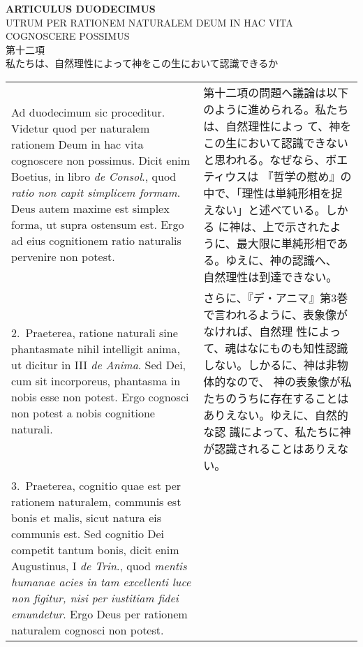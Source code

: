 \documentclass[10pt]{jsarticle} %
\begin{document}
\newpage
{}

\begin{center}
 {\Large {\bf ARTICULUS DUODECIMUS}}\\
{\large UTRUM PER RATIONEM NATURALEM DEUM IN HAC VITA\\COGNOSCERE POSSIMUS}\\
{\large 第十二項\\私たちは、自然理性によって神をこの生において認識できるか}

\end{center}


\begin{longtable}{p{21em}p{21em}}

{\sc  Ad duodecimum sic proceditur}. Videtur quod per naturalem rationem
Deum in hac vita cognoscere non possimus. Dicit enim Boetius, in libro
{\it de Consol}., quod {\it ratio non capit simplicem formam}. Deus
autem maxime est simplex forma, ut supra ostensum est. Ergo ad eius
cognitionem ratio naturalis pervenire non potest.

&

第十二項の問題へ議論は以下のように進められる。私たちは、自然理性によっ
て、神をこの生において認識できないと思われる。なぜなら、ボエティウスは
『哲学の慰め』の中で、「理性は単純形相を捉えない」と述べている。しかる
に神は、上で示されたように、最大限に単純形相である。ゆえに、神の認識へ、
自然理性は到達できない。

\\



2.~{\sc  Praeterea}, ratione naturali sine phantasmate nihil
intelligit anima, ut dicitur in III {\it de Anima}. Sed Dei, cum sit
incorporeus, phantasma in nobis esse non potest. Ergo cognosci non
potest a nobis cognitione naturali.

&

さらに、『デ・アニマ』第3巻で言われるように、表象像がなければ、自然理
性によって、魂はなにものも知性認識しない。しかるに、神は非物体的なので、
神の表象像が私たちのうちに存在することはありえない。ゆえに、自然的な認
識によって、私たちに神が認識されることはありえない。

\\



3.~{\sc  Praeterea}, cognitio quae est per rationem naturalem,
 communis est bonis et malis, sicut natura eis communis est. Sed
 cognitio Dei competit tantum bonis, dicit enim Augustinus, I {\it de Trin}.,
 quod {\it mentis humanae acies in tam excellenti luce non figitur, nisi per
 iustitiam fidei emundetur}. Ergo Deus per rationem naturalem cognosci
 non potest.



\end{longtable}
\end{document}
